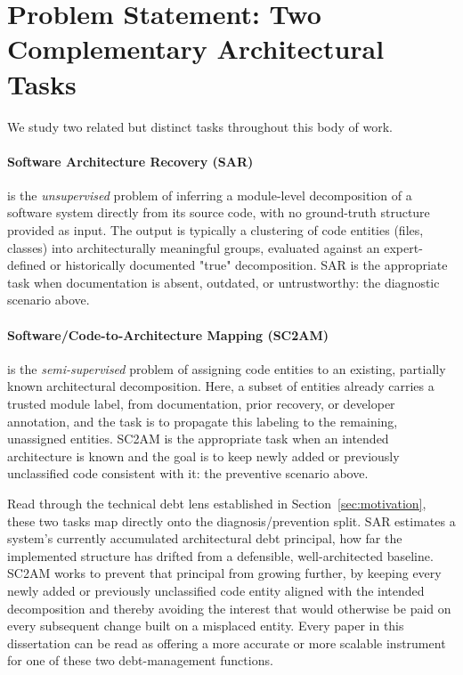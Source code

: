 \section{Problem Statement: Two Complementary Architectural Tasks}
\label{sec:problem-statement}

We study two related but distinct tasks throughout this body of work.

\paragraph{Software Architecture Recovery (SAR)} is the \emph{unsupervised} problem of inferring a module-level decomposition of a software system directly from its source code, with no ground-truth structure provided as input. The output is typically a clustering of code entities (files, classes) into architecturally meaningful groups, evaluated against an expert-defined or historically documented "true" decomposition. SAR is the appropriate task when documentation is absent, outdated, or untrustworthy: the diagnostic scenario above.

\paragraph{Software/Code-to-Architecture Mapping (SC2AM)} is the \emph{semi-supervised} problem of assigning code entities to an existing, partially known architectural decomposition. Here, a subset of entities already carries a trusted module label, from documentation, prior recovery, or developer annotation, and the task is to propagate this labeling to the remaining, unassigned entities. SC2AM is the appropriate task when an intended architecture is known and the goal is to keep newly added or previously unclassified code consistent with it: the preventive scenario above.

Read through the technical debt lens established in Section~\ref{sec:motivation}, these two tasks map directly onto the diagnosis/prevention split. SAR estimates a system's currently accumulated architectural debt principal, how far the implemented structure has drifted from a defensible, well-architected baseline. SC2AM works to prevent that principal from growing further, by keeping every newly added or previously unclassified code entity aligned with the intended decomposition and thereby avoiding the interest that would otherwise be paid on every subsequent change built on a misplaced entity. Every paper in this dissertation can be read as offering a more accurate or more scalable instrument for one of these two debt-management functions.

